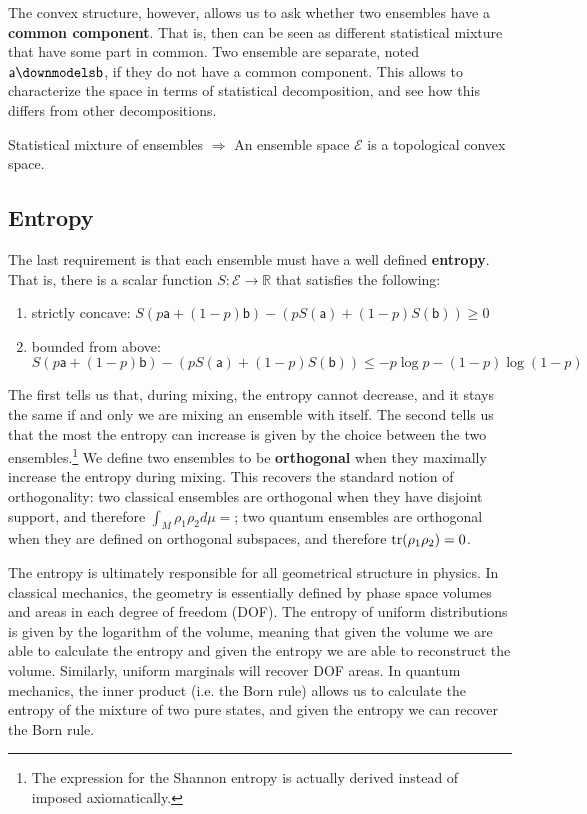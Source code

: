 \documentclass[10pt,twocolumn, nofootinbib]{revtex4-2}
\newcommand{\ens}[1][e] {\mathsf{#1}} %
\newcommand{\Ens}[1][E] {\mathcal{#1}} %
\def\separate{\downmodels}
\begin{document}
The convex structure, however, allows us to ask whether two ensembles have a \textbf{common component}. That is, then can be seen as different statistical mixture that have some part in common. Two ensemble are separate, noted $\ens[a] \separate \ens[b]$, if they do not have a common component. This allows to characterize the space in terms of statistical decomposition, and see how this differs from other decompositions.

\begin{tcolorbox}[colback=white, colframe=black]
	Statistical mixture of ensembles $\Rightarrow$ An ensemble space $\Ens$ is a topological convex space.
\end{tcolorbox}

\subsection{Entropy}
The last requirement is that each ensemble must have a well defined \textbf{entropy}. That is, there is a scalar function $S : \Ens \to \mathbb{R}$ that satisfies the following:
\begin{enumerate}
	\item strictly concave: $S(p \ens[a] + (1-p) \ens[b]) - (p S(\ens[a]) + (1-p) S(\ens[b]) ) \geq 0$
	\item bounded from above: $S(p \ens[a] + (1-p) \ens[b]) - (p S(\ens[a]) + (1-p) S(\ens[b]) ) \leq - p \log p - (1-p) \log(1-p)$
\end{enumerate}
The first tells us that, during mixing, the entropy cannot decrease, and it stays the same if and only we are mixing an ensemble with itself. The second tells us that the most the entropy can increase is given by the choice between the two ensembles.\footnote{The expression for the Shannon entropy is actually derived instead of imposed axiomatically.} We define two ensembles to be \textbf{orthogonal} when they maximally increase the entropy during mixing. This recovers the standard notion of orthogonality: two classical ensembles are orthogonal when they have disjoint support, and therefore $\int_M \rho_1 \rho_2 d\mu = $; two quantum ensembles are orthogonal when they are defined on orthogonal subspaces, and therefore $\operatorname{tr}(\rho_1 \rho_2) = 0$.

The entropy is ultimately responsible for all geometrical structure in physics. In classical mechanics, the geometry is essentially defined by phase space volumes and areas in each degree of freedom (DOF). The entropy of uniform distributions is given by the logarithm of the volume, meaning that given the volume we are able to calculate the entropy and given the entropy we are able to reconstruct the volume. Similarly, uniform marginals will recover DOF areas. In quantum mechanics, the inner product (i.e. the Born rule) allows us to calculate the entropy of the mixture of two pure states, and given the entropy we can recover the Born rule.
\end{document}
